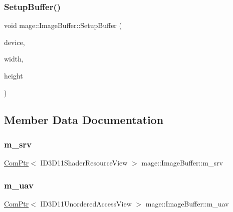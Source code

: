\subsubsection{\texorpdfstring{Setup\+Buffer()}{SetupBuffer()}}
{\footnotesize\ttfamily void mage\+::\+Image\+Buffer\+::\+Setup\+Buffer (\begin{DoxyParamCaption}\item[{I\+D3\+D11\+Device2 $\ast$}]{device,  }\item[{\hyperlink{namespacemage_af2b398bf98eb10351f49cad73fe2cc73}{u32}}]{width,  }\item[{\hyperlink{namespacemage_af2b398bf98eb10351f49cad73fe2cc73}{u32}}]{height }\end{DoxyParamCaption})\hspace{0.3cm}{\ttfamily [private]}}



\subsection{Member Data Documentation}
\hypertarget{structmage_1_1_image_buffer_a3909901d1e896e85664b68b59c7c166c}{}\label{structmage_1_1_image_buffer_a3909901d1e896e85664b68b59c7c166c} 
\subsubsection{\texorpdfstring{m\+\_\+srv}{m\_srv}}
{\footnotesize\ttfamily \hyperlink{namespacemage_ae74f374780900893caa5555d1031fd79}{Com\+Ptr}$<$ I\+D3\+D11\+Shader\+Resource\+View $>$ mage\+::\+Image\+Buffer\+::m\+\_\+srv\hspace{0.3cm}{\ttfamily [private]}}

\hypertarget{structmage_1_1_image_buffer_abd30a4842e00bb7729b3c92029e34ee0}{}\label{structmage_1_1_image_buffer_abd30a4842e00bb7729b3c92029e34ee0} 
\subsubsection{\texorpdfstring{m\+\_\+uav}{m\_uav}}
{\footnotesize\ttfamily \hyperlink{namespacemage_ae74f374780900893caa5555d1031fd79}{Com\+Ptr}$<$ I\+D3\+D11\+Unordered\+Access\+View $>$ mage\+::\+Image\+Buffer\+::m\+\_\+uav\hspace{0.3cm}{\ttfamily [private]}}

